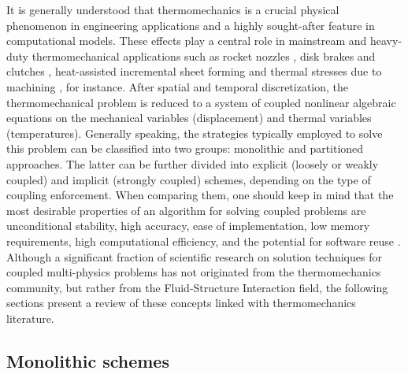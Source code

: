 It is generally understood that thermomechanics is a crucial physical phenomenon in engineering applications and a highly sought-after feature in computational models.
These effects play a central role in mainstream and heavy-duty thermomechanical applications such as rocket nozzles \citep{kuhl2002ThermomechanicalAnalysisOptimization,danowski_monolithic_2013}, disk brakes and clutches \citep{yevtushenko2015NumericalAnalysisThermal}, heat-assisted incremental sheet forming \citep{liu2018HeatassistedIncrementalSheet} and thermal stresses due to machining \citep{elsheikh2021ComprehensiveReviewResidual}, for instance.
After spatial and temporal discretization, the thermomechanical problem is reduced to a system of coupled nonlinear algebraic equations on the mechanical variables (displacement) and thermal variables (temperatures).
Generally speaking, the strategies typically employed to solve this problem can be classified into two groups: monolithic and partitioned approaches.
The latter can be further divided into explicit (loosely or weakly coupled) and implicit (strongly coupled) schemes, depending on the type of coupling enforcement.
When comparing them, one should keep in mind that the most desirable properties of an algorithm for solving coupled problems are unconditional stability, high accuracy, ease of implementation, low memory requirements, high computational efficiency, and the potential for software reuse \citep{fellipa_partitioned_1988}.
Although a significant fraction of scientific research on solution techniques for coupled multi-physics problems has not originated from the thermomechanics community, but rather from the Fluid-Structure Interaction field, the following sections present a review of these concepts linked with thermomechanics literature.

\subsection{Monolithic schemes}
\label{sec:monolithic-schemes}

